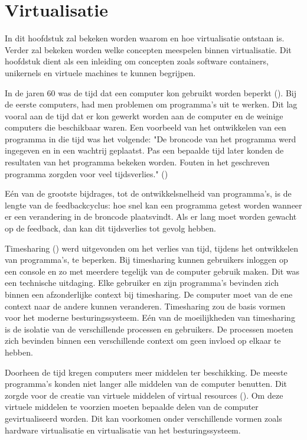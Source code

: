 \chapter{Virtualisatie}
\label{ch:virtualisatie}

In dit hoofdstuk zal bekeken worden waarom en hoe virtualisatie ontstaan is. Verder zal bekeken worden welke concepten meespelen binnen virtualisatie. Dit hoofdstuk dient als een inleiding om concepten zoals software containers, unikernels en virtuele machines te kunnen begrijpen.

In de jaren 60 was de tijd dat een computer kon gebruikt worden beperkt (\cite{conferences_modern_1968}). Bij de eerste computers, had men problemen om programma's uit te werken. Dit lag vooral aan de tijd dat er kon gewerkt worden aan de computer en de weinige computers die beschikbaar waren. Een voorbeeld van het ontwikkelen van een programma in die tijd was het volgende: "De broncode van het programma werd ingegeven en in een wachtrij geplaatst. Pas een bepaalde tijd later konden de resultaten van het programma bekeken worden. Fouten in het geschreven programma zorgden voor veel tijdsverlies." (\cite{conferences_modern_1968})

Eén van de grootste bijdrages, tot de ontwikkelsnelheid van programma's, is de lengte van de feedbackcyclus: hoe snel kan een programma getest worden wanneer er een verandering in de broncode plaatsvindt. Als er lang moet worden gewacht op de feedback, dan kan dit tijdsverlies tot gevolg hebben.

Timesharing (\cite{pyke_jr._time-shared_1967}) werd uitgevonden om het verlies van tijd, tijdens het ontwikkelen van programma's, te beperken. Bij timesharing kunnen gebruikers inloggen op een console en zo met meerdere tegelijk van de computer gebruik maken. Dit was een technische uitdaging. Elke gebruiker en zijn programma's bevinden zich binnen een afzonderlijke context bij timesharing. De computer moet van de ene context naar de andere kunnen veranderen. Timesharing zou de basis vormen voor het moderne besturingssysteem. Eén van de moeilijkheden van timesharing is de isolatie van de verschillende processen en gebruikers. De processen moeten zich bevinden binnen een verschillende context om geen invloed op elkaar te hebben.

Doorheen de tijd kregen computers meer middelen ter beschikking. De meeste programma's konden niet langer alle middelen van de computer benutten. Dit zorgde voor de creatie van virtuele middelen of virtual resources (\cite{vakilinia_modeling_2015}). Om deze virtuele middelen te voorzien moeten bepaalde delen van de computer gevirtualiseerd worden. Dit kan voorkomen onder verschillende vormen zoals hardware virtualisatie en virtualisatie van het besturingssysteem.

